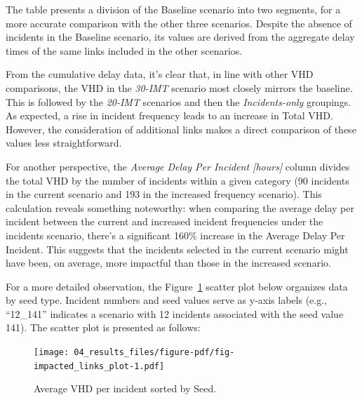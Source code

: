 \documentclass[
  letterpaper,
  authoryear]{elsarticle}
\begin{document}
The table presents a division of the Baseline scenario into two
segments, for a more accurate comparison with the other three scenarios.
Despite the absence of incidents in the Baseline scenario, its values
are derived from the aggregate delay times of the same links included in
the other scenarios.

From the cumulative delay data, it's clear that, in line with other VHD
comparisons, the VHD in the \emph{30-IMT} scenario most closely mirrors
the baseline. This is followed by the \emph{20-IMT} scenarios and then
the \emph{Incidents-only} groupings. As expected, a rise in incident
frequency leads to an increase in Total VHD. However, the consideration
of additional links makes a direct comparison of these values less
straightforward.

For another perspective, the \emph{Average Delay Per Incident
{[}hours{]}} column divides the total VHD by the number of incidents
within a given category (90 incidents in the current scenario and 193 in
the increased frequency scenario). This calculation reveals something
noteworthy: when comparing the average delay per incident between the
current and increased incident frequencies under the incidents scenario,
there's a significant 160\% increase in the Average Delay Per Incident.
This suggests that the incidents selected in the current scenario might
have been, on average, more impactful than those in the increased
scenario.

For a more detailed observation, the
Figure~\ref{fig-impacted_links_plot} scatter plot below organizes data
by seed type. Incident numbers and seed values serve as y-axis labels
(e.g., ``12\_141'' indicates a scenario with 12 incidents associated
with the seed value 141). The scatter plot is presented as follows:

\begin{figure}

{\centering \texttt{[image: 04\_results\_files/figure-pdf/fig-impacted\_links\_plot-1.pdf]}

}

\caption{\label{fig-impacted_links_plot}Average VHD per incident sorted
by Seed.}

\end{figure}
\end{document}
